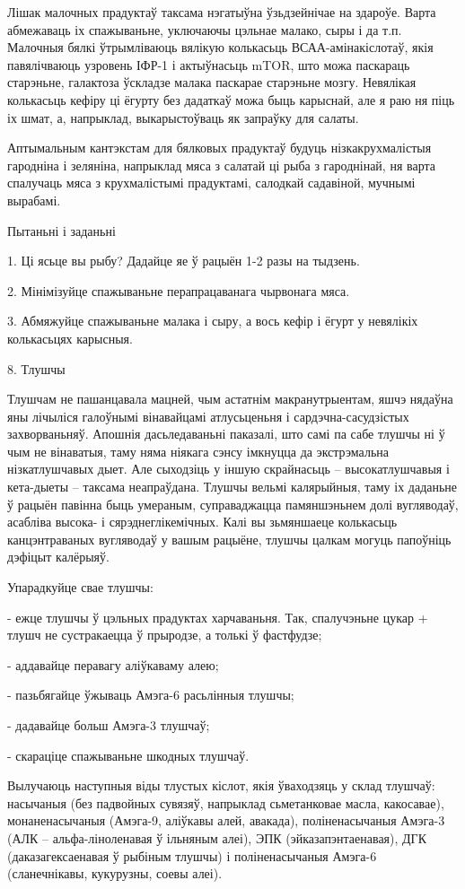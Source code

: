 Лішак малочных прадуктаў таксама нэгатыўна ўзьдзейнічае на здароўе. Варта абмежаваць іх спажываньне, уключаючы цэльнае малако, сыры і да т.п. Малочныя бялкі ўтрымліваюць вялікую колькасьць ВСАА-амінакіслотаў, якія павялічваюць узровень ІФР-1 і актыўнасьць mTOR, што можа паскараць старэньне, галактоза ўскладзе малака паскарае старэньне мозгу. Невялікая колькасьць кефіру ці ёгурту без дадаткаў можа быць карыснай, але я раю ня піць іх шмат, а, напрыклад, выкарыстоўваць як запраўку для салаты.

Аптымальным кантэкстам для бялковых прадуктаў будуць нізкакрухмалістыя гародніна і зеляніна, напрыклад мяса з салатай ці рыба з гароднінай, ня варта спалучаць мяса з крухмалістымі прадуктамі, салодкай садавіной, мучнымі вырабамі.

Пытаньні і заданьні

1. Ці ясьце вы рыбу? Дадайце яе ў рацыён 1-2 разы на тыдзень.

2. Мінімізуйце спажываньне перапрацаванага чырвонага мяса.

3. Абмяжуйце спажываньне малака і сыру, а вось кефір і ёгурт у невялікіх колькасьцях карысныя.


8. Тлушчы

Тлушчам не пашанцавала мацней, чым астатнім макранутрыентам, яшчэ нядаўна яны лічыліся галоўнымі вінавайцамі атлусьценьня і сардэчна-сасудзістых захворваньняў. Апошнія дасьледаваньні паказалі, што самі па сабе тлушчы ні ў чым не вінаватыя, таму няма ніякага сэнсу імкнуцца да экстрэмальна нізкатлушчавых дыет. Але сыходзіць у іншую скрайнасьць – высокатлушчавыя і кета-дыеты – таксама неапраўдана. Тлушчы вельмі калярыйныя, таму іх даданьне ў рацыён павінна быць умераным, суправаджацца памяншэньнем долі вугляводаў, асабліва высока- і сярэднеглікемічных. Калі вы зьмяншаеце колькасьць канцэнтраваных вугляводаў у вашым рацыёне, тлушчы цалкам могуць папоўніць дэфіцыт калёрыяў.

Упарадкуйце свае тлушчы:

- ежце тлушчы ў цэльных прадуктах харчаваньня. Так, спалучэньне цукар + тлушч не сустракаецца ў прыродзе, а толькі ў фастфудзе;

- аддавайце перавагу аліўкаваму алею;

- пазьбягайце ўжываць Амэга-6 расьлінныя тлушчы;

- дадавайце больш Амэга-3 тлушчаў;

- скараціце спажываньне шкодных тлушчаў.

Вылучаюць наступныя віды тлустых кіслот, якія ўваходзяць у склад тлушчаў: насычаныя (без падвойных сувязяў, напрыклад сьметанковае масла, какосавае), монаненасычаныя (Амэга-9, аліўкавы алей, авакада), поліненасычаныя Амэга-3 (АЛК – альфа-ліноленавая ў ільняным алеі), ЭПК (эйказапэнтаенавая), ДГК (даказагексаенавая ў рыбіным тлушчы) і поліненасычаныя Амэга-6 (сланечнікавы, кукурузны, соевы алеі).

